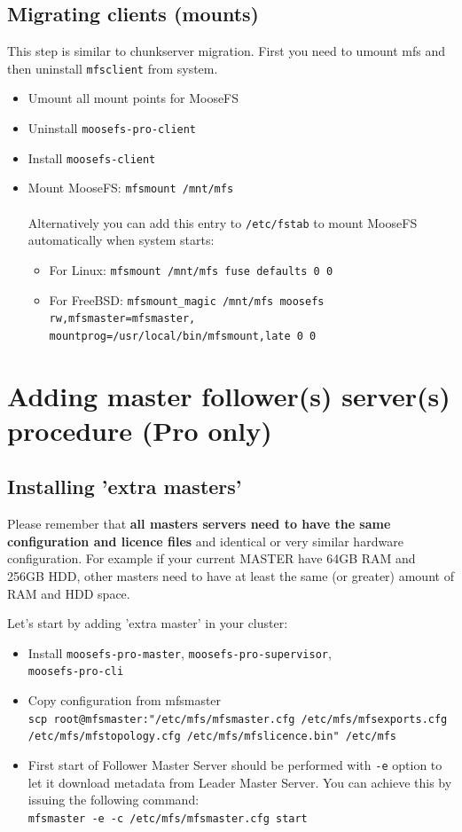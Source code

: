 \documentclass[a4paper,11pt,english]{report}
\def\code#1{\texttt{#1}}
\begin{document}
		\section{Migrating clients (mounts)}
		This step is similar to chunkserver migration. First you need to umount mfs and then uninstall \code{mfsclient} from system.
		\begin{itemize}
		\item Umount all mount points for MooseFS
		\item Uninstall \code{moosefs-pro-client}
		\item Install \code{moosefs-client}
		\item Mount MooseFS: \code{mfsmount /mnt/mfs} \\\\
		Alternatively you can add this entry to \code{/etc/fstab} to mount MooseFS automatically when system starts: \\
			\begin{itemize}
				\item For Linux: \code{mfsmount		/mnt/mfs		fuse	defaults	0	0}
				\item For FreeBSD: \code{mfsmount\_magic  /mnt/mfs        moosefs rw,mfsmaster=mfsmaster,\\mountprog=/usr/local/bin/mfsmount,late    0       0}
			\end{itemize}
		\end{itemize}
		
	\chapter{Adding master follower(s) server(s) procedure (Pro only)}
		\section{Installing 'extra masters'}
		Please remember that \textbf{all masters servers need to have the same configuration and licence files} and identical or very similar hardware configuration. For example if your current MASTER have 64GB RAM and 256GB HDD, other masters need to have at least the same (or greater) amount of RAM and HDD space.
		
		Let's start by adding 'extra master' in your cluster:
		\begin{itemize}
			\item Install \code{moosefs-pro-master}, \code{moosefs-pro-supervisor}, \\ \code{moosefs-pro-cli}
			\item Copy configuration from mfsmaster\\ \code{scp root@mfsmaster:"/etc/mfs/mfsmaster.cfg /etc/mfs/mfsexports.cfg \\ /etc/mfs/mfstopology.cfg /etc/mfs/mfslicence.bin" /etc/mfs}
		
			\item First start of Follower Master Server should be performed with \code{-e} option to let it download metadata from Leader Master Server. You can achieve this by issuing the following command: \\
			\code{mfsmaster -e -c /etc/mfs/mfsmaster.cfg start}			
		\end{itemize}
		
\end{document}
